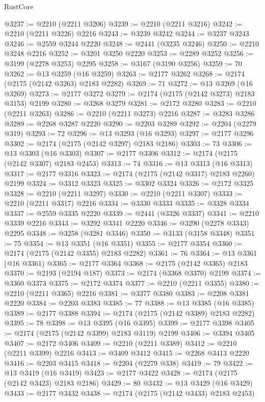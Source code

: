 \begin{lexlean}{RustCore}
\begin{coremodule}
@3237 := @2210 (@2211 @3206)
@3239 := @2210 (@2211 @3216)
@3242 := @2210 (@2211 @3226) @2216
@3243 := @3239 @3242
@3244 := @3237 @3243
@3246 := @2559 @3244 @2220
@3248 := @2441 (@3235 @3246)
@3250 := @2210 @3248 @2216
@3252 := @3201 @3250 @2220
@3253 := @2289 @3252
@3256 := @3199 (@2278 @3253) @2295
@3258 := @3167 (@3190 @3256)
@3259 := 70
@3262 := @13 @3259 (@16 @3259)
@3263 := @2177 @3262
@3268 := @2174 (@2175 (@2142 @3263) @2183 @2282)
@3269 := 71
@3272 := @13 @3269 (@16 @3269)
@3273 := @2177 @3272
@3279 := @2174 (@2175 (@2142 @3273) @2183 @3153) @2199
@3280 := @3268 @3279
@3281 := @2172 @3280
@3283 := @2210 (@2211 @3263)
@3286 := @2210 (@2211 @3273) @2216
@3287 := @3283 @3286
@3289 := @2268 @3287 @2220
@3290 := @2203 @3289
@3292 := @2204 (@2279 @319)
@3293 := 72
@3296 := @13 @3293 (@16 @3293)
@3297 := @2177 @3296
@3302 := @2174 (@2175 (@2142 @3297) @2183 @2186)
@3303 := 73
@3306 := @13 @3303 (@16 @3303)
@3307 := @2177 @3306
@3312 := @2174 (@2175 (@2142 @3307) @2183 @2453)
@3313 := 74
@3316 := @13 @3313 (@16 @3313)
@3317 := @2177 @3316
@3323 := @2174 (@2175 (@2142 @3317) @2183 @2260) @2199
@3324 := @3312 @3323
@3325 := @3302 @3324
@3326 := @2172 @3325
@3328 := @2210 (@2211 @3297)
@3330 := @2210 (@2211 @3307)
@3333 := @2210 (@2211 @3317) @2216
@3334 := @3330 @3333
@3335 := @3328 @3334
@3337 := @2559 @3335 @2220
@3339 := @2441 (@3326 @3337)
@3341 := @2210 @3339 @2216
@3343 := @3292 @3341 @2220
@3346 := @3290 (@2278 @3343) @2295
@3348 := @3258 (@3281 @3346)
@3350 := @3133 (@3158 @3348)
@3351 := 75
@3354 := @13 @3351 (@16 @3351)
@3355 := @2177 @3354
@3360 := @2174 (@2175 (@2142 @3355) @2183 @2282)
@3361 := 76
@3364 := @13 @3361 (@16 @3361)
@3365 := @2177 @3364
@3368 := @2175 (@2142 @3365) @2183
@3370 := @2193 (@2194 @187)
@3373 := @2174 (@3368 @3370) @2199
@3374 := @3360 @3373
@3375 := @2172 @3374
@3377 := @2210 (@2211 @3355)
@3380 := @2210 (@2211 @3365) @2216
@3381 := @3377 @3380
@3383 := @2208 @3381 @2220
@3384 := @2203 @3383
@3385 := 77
@3388 := @13 @3385 (@16 @3385)
@3389 := @2177 @3388
@3394 := @2174 (@2175 (@2142 @3389) @2183 @2282)
@3395 := 78
@3398 := @13 @3395 (@16 @3395)
@3399 := @2177 @3398
@3405 := @2174 (@2175 (@2142 @3399) @2183 @3119) @2199
@3406 := @3394 @3405
@3407 := @2172 @3406
@3409 := @2210 (@2211 @3389)
@3412 := @2210 (@2211 @3399) @2216
@3413 := @3409 @3412
@3415 := @2268 @3413 @2220
@3416 := @2203 @3415
@3418 := @2204 (@2279 @338)
@3419 := 79
@3422 := @13 @3419 (@16 @3419)
@3423 := @2177 @3422
@3428 := @2174 (@2175 (@2142 @3423) @2183 @2186)
@3429 := 80
@3432 := @13 @3429 (@16 @3429)
@3433 := @2177 @3432
@3438 := @2174 (@2175 (@2142 @3433) @2183 @2453)

\end{coremodule}
\end{lexlean}
